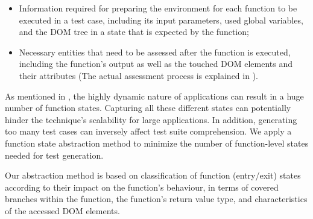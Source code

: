 \begin{itemize}[noitemsep]
\item Information required for preparing the environment for each function to be executed in a test case, including its input parameters, used global variables, and the DOM tree in a state that is expected by the function;
\item Necessary entities that need to be assessed after the function is executed, including the function's output as well as the touched DOM elements and their attributes (The actual assessment process is explained in ).
\end{itemize}


As mentioned in , the highly dynamic nature of \javascript applications can result in a huge number of function states. Capturing all these different states can potentially hinder the technique's scalability for large applications. In addition, generating too many test cases can inversely affect test suite comprehension.
We apply a function state abstraction method to minimize the number of function-level states needed for test generation.



Our abstraction method is based on classification of function (entry/exit) states according to their impact on the function's behaviour, in terms of covered branches within the function, the function's return value type, and characteristics of the accessed DOM elements.

